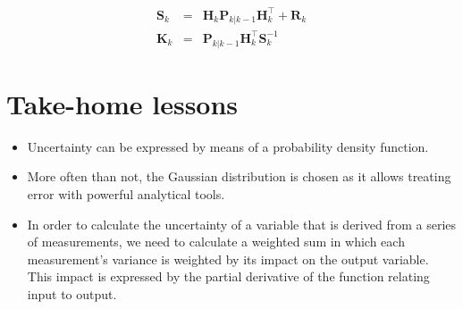 
\begin{eqnarray}
\boldsymbol{S}_{k}&=&{\boldsymbol{H}_{k}}\boldsymbol{P}_{k|k-1}{\boldsymbol{H}_{k}^\top}+\boldsymbol{R}_{k}\\
\boldsymbol{K}_{k}&=&\boldsymbol{P}_{k|k-1}{\boldsymbol{H}_{k}^\top}\boldsymbol{S}_{k}^{-1}
\end{eqnarray}

\section{Take-home lessons}
\begin{itemize}
\item Uncertainty can be expressed by means of a probability density function.
\item More often than not, the Gaussian distribution is chosen as it allows treating error with powerful analytical tools.
\item In order to calculate the uncertainty of a variable that is derived from a series of measurements, we need to calculate a weighted sum in which each measurement's variance is weighted by its impact on the output variable. This impact is expressed by the partial derivative of the function relating input to output.
\end{itemize}

